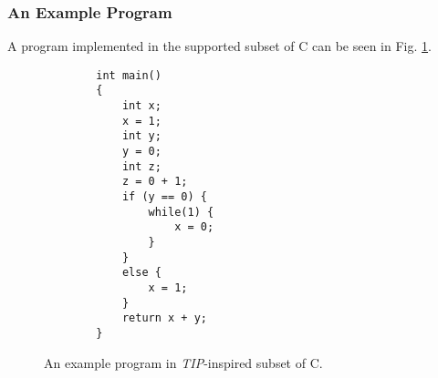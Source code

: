 \subsubsection{An Example Program}
A program implemented in the supported subset of C can be seen in Fig. \ref{exampleprogram}.

\begin{figure}[H]
    \centering
    \begin{verbatim}
        int main()
        {
            int x;
            x = 1;
            int y;
            y = 0;
            int z;
            z = 0 + 1;
            if (y == 0) {
                while(1) {
                    x = 0;
                }
            }
            else {
                x = 1;
            }
            return x + y;
        }
    \end{verbatim}
    \caption{An example program in \textit{TIP}-inspired subset of C.}
    \label{exampleprogram}
\end{figure}

